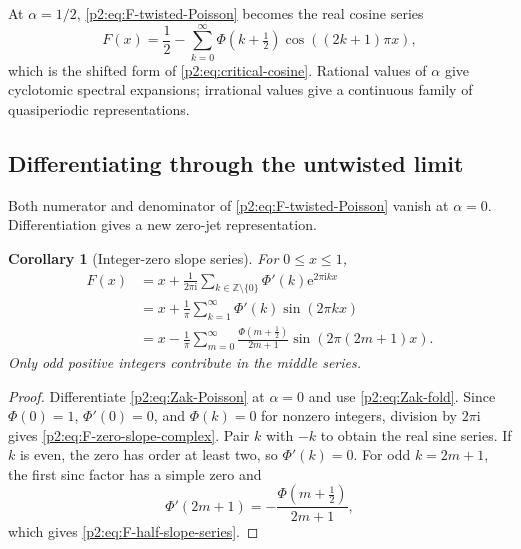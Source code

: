 \documentclass[11pt,oneside]{article}
\newtheorem{corollary}[theorem]{Corollary}
\theoremstyle{definition}
\newcommand{\e}{\mathrm e}
\newcommand{\ii}{\mathrm i}
\newcommand{\Z}{\mathbb Z}
\begin{document}
At $\alpha=1/2$, \eqref{p2:eq:F-twisted-Poisson} becomes the real cosine series
\begin{equation}
 F(x)=\frac12-
 \sum_{k=0}^{\infty}\Phi(k+\tfrac12)
   \cos((2k+1)\pi x),                                     \label{p2:eq:F-half-integer-cosine}
\end{equation}
which is the shifted form of \eqref{p2:eq:critical-cosine}.  Rational values of
$\alpha$ give cyclotomic spectral expansions; irrational values give a
continuous family of quasiperiodic representations.

\subsection{Differentiating through the untwisted limit}

Both numerator and denominator of \eqref{p2:eq:F-twisted-Poisson} vanish at
$\alpha=0$.  Differentiation gives a new zero-jet representation.

\begin{corollary}[Integer-zero slope series]
\label{p2:cor:zero-slope-F}
For $0\le x\le1$,
\begin{align}
 F(x)
 &=x+\frac1{2\pi\ii}
   \sum_{k\in\Z\setminus\{0\}}\Phi'(k)\e^{2\pi\ii kx}    \label{p2:eq:F-zero-slope-complex}\\
 &=x+\frac1\pi\sum_{k=1}^{\infty}\Phi'(k)
   \sin(2\pi kx)                                         \label{p2:eq:F-zero-slope-real}\\
 &=x-\frac1\pi\sum_{m=0}^{\infty}
   \frac{\Phi(m+\tfrac12)}{2m+1}
   \sin(2\pi(2m+1)x).                                    \label{p2:eq:F-half-slope-series}
\end{align}
Only odd positive integers contribute in the middle series.
\end{corollary}

\begin{proof}
Differentiate \eqref{p2:eq:Zak-Poisson} at $\alpha=0$ and use
\eqref{p2:eq:Zak-fold}.  Since $\Phi(0)=1$, $\Phi'(0)=0$, and
$\Phi(k)=0$ for nonzero integers, division by $2\pi\ii$ gives
\eqref{p2:eq:F-zero-slope-complex}.  Pair $k$ with $-k$ to obtain the real sine
series.  If $k$ is even, the zero has order at least two, so $\Phi'(k)=0$.
For odd $k=2m+1$, the first sinc factor has a simple zero and
\begin{equation}
 \Phi'(2m+1)=-\frac{\Phi(m+\tfrac12)}{2m+1},               \label{p2:eq:odd-zero-slope}
\end{equation}
which gives \eqref{p2:eq:F-half-slope-series}.
\end{proof}
\end{document}
